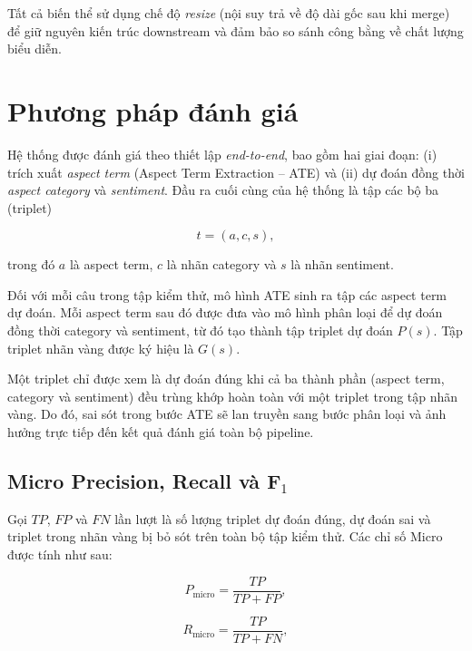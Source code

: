 Tất cả biến thể sử dụng chế độ \textit{resize} (nội suy trả về độ dài
gốc sau khi merge) để giữ nguyên kiến trúc downstream và đảm bảo so
sánh công bằng về chất lượng biểu diễn.


\section{Phương pháp đánh giá}
\label{subsec:evaluation}

Hệ thống được đánh giá theo thiết lập \textit{end-to-end}, bao gồm hai
giai đoạn: (i) trích xuất \textit{aspect term} (Aspect Term Extraction --
ATE) và (ii) dự đoán đồng thời \textit{aspect category} và
\textit{sentiment}. Đầu ra cuối cùng của hệ thống là tập các bộ ba
(triplet)

\begin{equation}
t=(a,c,s),
\end{equation}

trong đó $a$ là aspect term, $c$ là nhãn category và $s$ là nhãn
sentiment.

Đối với mỗi câu trong tập kiểm thử, mô hình ATE sinh ra tập các aspect
term dự đoán. Mỗi aspect term sau đó được đưa vào mô hình phân loại để
dự đoán đồng thời category và sentiment, từ đó tạo thành tập triplet dự
đoán $P(s)$. Tập triplet nhãn vàng được ký hiệu là $G(s)$.

Một triplet chỉ được xem là dự đoán đúng khi cả ba thành phần
(aspect term, category và sentiment) đều trùng khớp hoàn toàn với một
triplet trong tập nhãn vàng. Do đó, sai sót trong bước ATE sẽ lan truyền
sang bước phân loại và ảnh hưởng trực tiếp đến kết quả đánh giá toàn bộ
pipeline.

\subsection{Micro Precision, Recall và F$_1$}

Gọi $TP$, $FP$ và $FN$ lần lượt là số lượng triplet dự đoán đúng, dự
đoán sai và triplet trong nhãn vàng bị bỏ sót trên toàn bộ tập kiểm thử.
Các chỉ số Micro được tính như sau:

\begin{equation}
P_{\mathrm{micro}}
=
\frac{TP}{TP+FP},
\end{equation}

\begin{equation}
R_{\mathrm{micro}}
=
\frac{TP}{TP+FN},
\end{equation}

